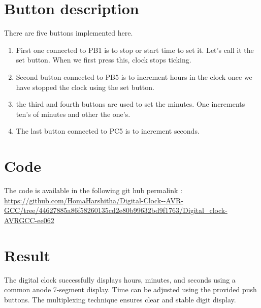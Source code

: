 \documentclass[journal]{IEEEtran}
\begin{document}
\section{Button description}
There are five buttons implemented here. 
\begin{enumerate}
    \item First one connected to PB1 is to stop or start time to set it. Let's call it the set button. When we first press this, clock stops ticking.
    \item Second button connected to PB5 is to increment hours in the clock once we have stopped the clock using the set button.
    \item the third and fourth buttons are used to set the minutes. One increments ten's of minutes and other the one's.
    \item The last button connected to PC5 is to increment seconds.
\end{enumerate}
\section{Code}
The code is available in the following git hub permalink :\\
\url{https://github.com/HomaHarshitha/Digital-Clock--AVR-GCC/tree/44627885a86f58260135cd2e80b99632bd9f1763/Digital_clock-AVRGCC-ee062}
\section{Result}
The digital clock successfully displays hours, minutes, and seconds using a common anode 7-segment display. Time can be adjusted using the provided push buttons. The multiplexing technique ensures clear and stable digit display.
\end{document}

